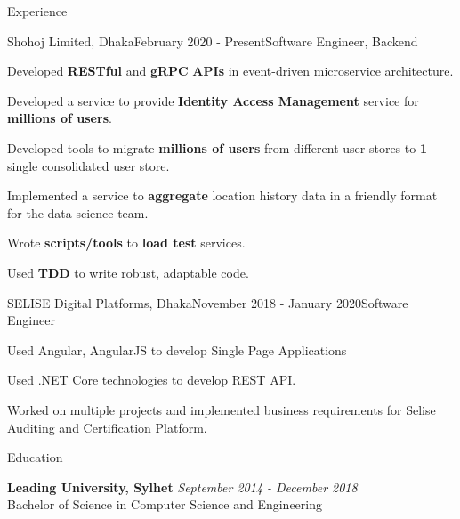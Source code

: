 \documentclass{resume}
\begin{document}
\begin{rSection}{Experience}

\begin{rSubsection}{Shohoj Limited, Dhaka}{February 2020 - Present}{Software Engineer, Backend}{}

\item Developed \textbf{RESTful} and \textbf{gRPC} \textbf{APIs} in event-driven microservice architecture.
\item Developed a service to provide \textbf{Identity Access Management} service for \textbf{millions of users}.
\item Developed tools to migrate \textbf{millions of users} from different user stores to \textbf{1} single consolidated user store.
\item Implemented a service to \textbf{aggregate} location history data in a friendly format for the data science team.
\item Wrote \textbf{scripts/tools} to \textbf{load test} services.
\item Used \textbf{TDD} to write robust, adaptable code.
\end{rSubsection}

\begin{rSubsection}{SELISE Digital Platforms, Dhaka}{November 2018 - January 2020}{Software Engineer}{}
\item Used Angular, AngularJS to develop Single Page Applications
\item Used .NET Core technologies to develop REST API.
\item Worked on multiple projects and implemented business requirements for Selise Auditing and Certification Platform.
\end{rSubsection}

\end{rSection}


\begin{rSection}{Education}

{\bf Leading University, Sylhet} \hfill {\em September 2014 - December 2018}
\\ Bachelor of Science in Computer Science and Engineering
\end{rSection}

\end{document}
